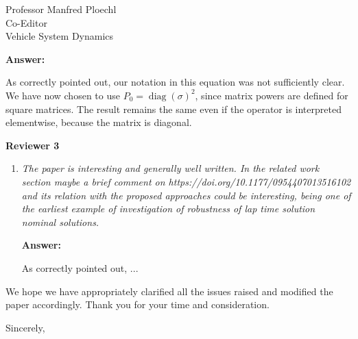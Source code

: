 \documentclass{letter}
\DeclareMathOperator{\diag}{diag}
\begin{document}
\begin{letter}{Professor Manfred Ploechl\\
Co-Editor\\
Vehicle System Dynamics}
\begin{enumerate}
\vspace{2mm}

\textbf{Answer:}

As correctly pointed out, our notation in this equation was not sufficiently clear. We have now chosen to use $P_0=\diag(\sigma)^2$, since matrix powers are defined for square matrices. The result remains the same even if the operator is interpreted elementwise, because the matrix is diagonal.

\hrulefill

\end{enumerate}

\textbf{Reviewer 3}

\begin{enumerate}

\item
\textit{The paper is interesting and generally well written. In the related work section maybe a brief comment on https://doi.org/10.1177/0954407013516102 and its relation with the proposed approaches could be interesting, being one of the earliest example of investigation of robustness of lap time solution nominal solutions.}

\vspace{2mm}

\textbf{Answer:}

 As correctly pointed out, ... 

\hrulefill
 
\end{enumerate}

We hope we have appropriately clarified all the issues raised and modified the paper accordingly. Thank you for your time and consideration.


\vspace{2\parskip} %
\closing{Sincerely,}
\vspace{2\parskip} %



\end{letter}
\end{document}
